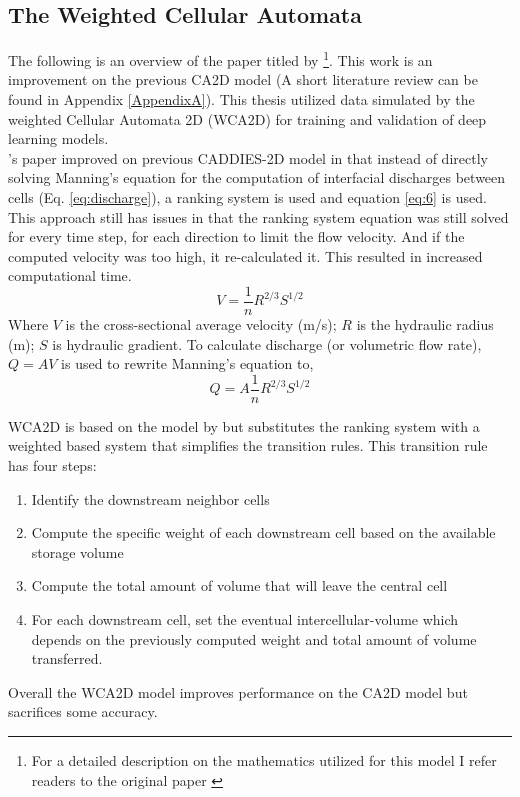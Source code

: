 \subsection*{The Weighted Cellular Automata}
The following is an overview of the paper titled   by \citeauthor{guidolin2016weighted} \footnote{For a detailed description on the mathematics utilized for this model I refer readers to the original paper \cite{guidolin2016weighted}}. This work is an improvement on the previous CA2D model (A short literature review can be found in Appendix \ref{AppendixA}). This thesis utilized data simulated by the weighted Cellular Automata 2D (WCA2D) for training and validation of deep learning models.\\

\citeauthor{Ghimire}'s paper improved on previous CADDIES-2D model in that instead of directly solving Manning's equation for the computation of interfacial discharges between cells (Eq. \ref{eq:discharge}), a ranking system is used and equation \ref{eq:6} is used. This approach still has issues in that the ranking system equation was still solved for every time step, for each direction to limit the flow velocity. And if the computed velocity was too high, it re-calculated it. This resulted in increased computational time.
\begin{equation}
	\label{eq:manning}
	V = \frac{1}{n} {R}^{2/3}S^{1/2}
\end{equation}
Where $V$ is the cross-sectional average velocity (m/s); $R$ is the hydraulic radius (m); $S$ is hydraulic gradient. To calculate discharge (or volumetric flow rate), $Q = AV$ is used to rewrite Manning's equation to,
\begin{equation}
	\label{eq:discharge}
	Q = A \frac{1}{n} {R}^{2/3}S^{1/2}
\end{equation}

WCA2D is based on the model by \citeauthor{Ghimire} but substitutes the ranking system with a weighted based system that simplifies the transition rules. This transition rule has four steps:
\begin{enumerate}
	\item Identify the downstream neighbor cells
	\item Compute the specific weight of each downstream cell based on the available storage volume
	\item Compute the total amount of volume that will leave the central cell
	\item For each downstream cell, set the eventual intercellular-volume which depends on the previously computed weight and total amount of volume transferred.
\end{enumerate}

Overall the WCA2D model improves performance on the CA2D model but sacrifices some accuracy.
